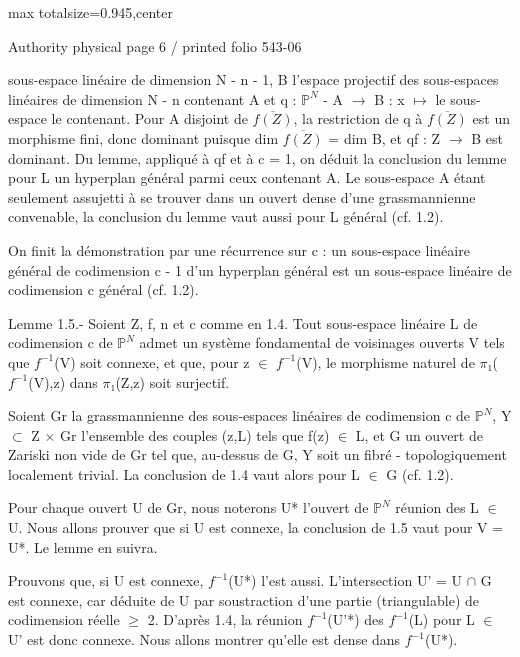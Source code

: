 \documentclass[10pt,a4paper]{article}
\begin{document}
\noindent\begin{adjustbox}{max totalsize={\textwidth}{0.945\textheight},center}
\begin{minipage}{\textwidth}
\noindent\hfill\scriptsize Authority physical page 6 / printed folio 543-06\par\normalsize
\noindent sous-espace linéaire de dimension N - n - 1, B l'espace projectif des sous-espaces linéaires de dimension N - n contenant A et q : \ensuremath{ℙ^N} - A \ensuremath{→} B : x \ensuremath{↦} le sous-espace le contenant. Pour A disjoint de \ensuremath{\overline{f(Z)}}, la restriction de q à \ensuremath{\overline{f(Z)}} est un morphisme fini, donc dominant puisque dim \ensuremath{\overline{f(Z)}} = dim B, et qf : Z \ensuremath{→} B est dominant. Du lemme, appliqué à qf et à c = 1, on déduit la conclusion du lemme pour L un hyperplan général parmi ceux contenant A. Le sous-espace A étant seulement assujetti à se trouver dans un ouvert dense d'une grassmannienne convenable, la conclusion du lemme vaut aussi pour L général (cf. 1.2).\par\smallskip
\noindent On finit la démonstration par une récurrence sur c : un sous-espace linéaire général de codimension c - 1 d'un hyperplan général est un sous-espace linéaire de codimension c général (cf. 1.2).\par\smallskip
\noindent Lemme 1.5.- Soient Z, f, n et c comme en 1.4. Tout sous-espace linéaire L de codimension c de \ensuremath{ℙ^N} admet un système fondamental de voisinages ouverts V tels que \ensuremath{f^{-1}}(V) soit connexe, et que, pour z \ensuremath{∈} \ensuremath{f^{-1}}(V), le morphisme naturel de \ensuremath{π₁}(\ensuremath{f^{-1}}(V),z) dans \ensuremath{π₁}(Z,z) soit surjectif.\par\smallskip
\noindent Soient Gr la grassmannienne des sous-espaces linéaires de codimension c de \ensuremath{ℙ^N}, Y \ensuremath{⊂} Z \ensuremath{×} Gr l'ensemble des couples (z,L) tels que f(z) \ensuremath{∈} L, et G un ouvert de Zariski non vide de Gr tel que, au-dessus de G, Y soit un fibré - topologiquement localement trivial. La conclusion de 1.4 vaut alors pour L \ensuremath{∈} G (cf. 1.2).\par\smallskip
\noindent Pour chaque ouvert U de Gr, nous noterons U* l'ouvert de \ensuremath{ℙ^N} réunion des L \ensuremath{∈} U. Nous allons prouver que si U est connexe, la conclusion de 1.5 vaut pour V = U*. Le lemme en suivra.\par\smallskip
\noindent Prouvons que, si U est connexe, \ensuremath{f^{-1}}(U*) l'est aussi. L'intersection U' = U \ensuremath{∩} G est connexe, car déduite de U par soustraction d'une partie (triangulable) de codimension réelle \ensuremath{≥} 2. D'après 1.4, la réunion \ensuremath{f^{-1}}(U'*) des \ensuremath{f^{-1}}(L) pour L \ensuremath{∈} U' est donc connexe. Nous allons montrer qu'elle est dense dans \ensuremath{f^{-1}}(U*).\par\smallskip

\end{minipage}
\end{adjustbox}
\end{document}
